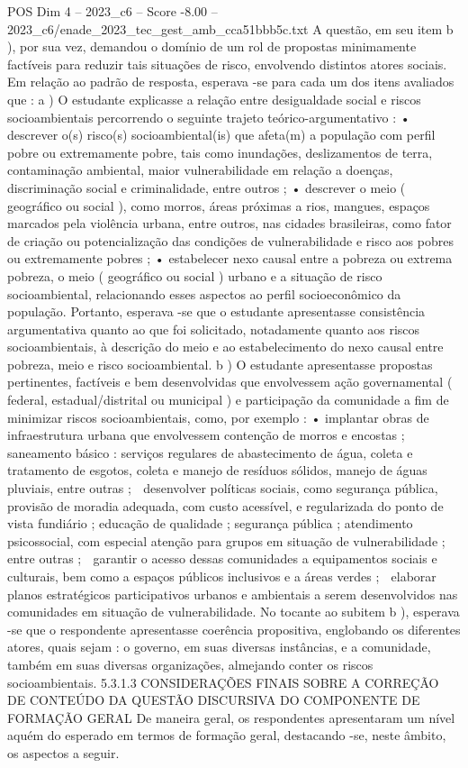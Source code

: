 \begin{textsample}{POS Dim 4 – 2023\_c6 – Score -8.00 – 2023\_c6/enade\_2023\_tec\_gest\_amb\_cca51bbb5c.txt}
A questão, em seu item b ), por sua vez, demandou o domínio de um rol de propostas minimamente factíveis para reduzir tais situações de risco, envolvendo distintos atores sociais.
Em relação ao padrão de resposta, esperava -se para cada um dos itens avaliados que : a ) O estudante explicasse a relação entre desigualdade social e riscos socioambientais percorrendo o seguinte trajeto teórico-argumentativo : • descrever o(s) risco(s) socioambiental(is) que afeta(m) a população com perfil pobre ou extremamente pobre, tais como inundações, deslizamentos de terra, contaminação ambiental, maior vulnerabilidade em relação a doenças, discriminação social e criminalidade, entre outros ; • descrever o meio ( geográfico ou social ), como morros, áreas próximas a rios, mangues, espaços marcados pela violência urbana, entre outros, nas cidades brasileiras, como fator de criação ou potencialização das condições de vulnerabilidade e risco aos pobres ou extremamente pobres ; • estabelecer nexo causal entre a pobreza ou extrema pobreza, o meio ( geográfico ou social ) urbano e a situação de risco socioambiental, relacionando esses aspectos ao perfil socioeconômico da população.
Portanto, esperava -se que o estudante apresentasse consistência argumentativa quanto ao que foi solicitado, notadamente quanto aos riscos socioambientais, à descrição do meio e ao estabelecimento do nexo causal entre pobreza, meio e risco socioambiental. b ) O estudante apresentasse propostas pertinentes, factíveis e bem desenvolvidas que envolvessem ação governamental ( federal, estadual/distrital ou municipal ) e participação da comunidade a fim de minimizar riscos socioambientais, como, por exemplo : • implantar obras de infraestrutura urbana que envolvessem contenção de morros e encostas ; saneamento básico : serviços regulares de abastecimento de água, coleta e tratamento de esgotos, coleta e manejo de resíduos sólidos, manejo de águas pluviais, entre outras ;  desenvolver políticas sociais, como segurança pública, provisão de moradia adequada, com custo acessível, e regularizada do ponto de vista fundiário ; educação de qualidade ; segurança pública ; atendimento psicossocial, com especial atenção para grupos em situação de vulnerabilidade ; entre outras ;  garantir o acesso dessas comunidades a equipamentos sociais e culturais, bem como a espaços públicos inclusivos e a áreas verdes ;  elaborar planos estratégicos participativos urbanos e ambientais a serem desenvolvidos nas comunidades em situação de vulnerabilidade.
No tocante ao subitem b ), esperava -se que o respondente apresentasse coerência propositiva, englobando os diferentes atores, quais sejam : o governo, em suas diversas instâncias, e a comunidade, também em suas diversas organizações, almejando conter os riscos socioambientais. 5.3.1.3 CONSIDERAÇÕES FINAIS SOBRE A CORREÇÃO DE CONTEÚDO DA QUESTÃO DISCURSIVA DO COMPONENTE DE FORMAÇÃO GERAL De maneira geral, os respondentes apresentaram um nível aquém do esperado em termos de formação geral, destacando -se, neste âmbito, os aspectos a seguir.

\end{textsample}
